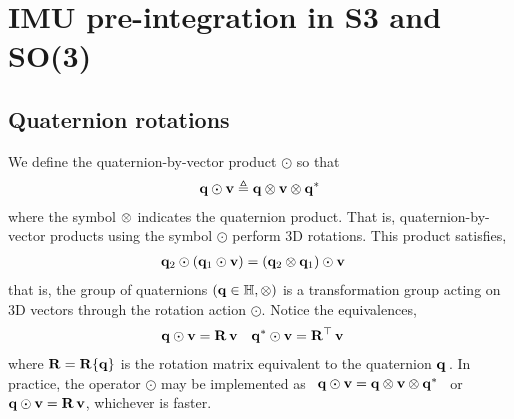

\newcommand{\bw}{{\bfomega}}
\newcommand{\bth}{{\bftheta}}
\newcommand{\bphi}{{\bfphi}}
\newcommand{\nth}{\norm{\bth}}
\newcommand{\ab}{{\bfa_b}}
\newcommand{\wb}{{\bw_b}}
\newcommand{\D}{\Delta}
\newcommand{\Dzero}{{\D^0}}
\newcommand{\Dp}{{\D\bfp}}
\newcommand{\Dv}{{\D\bfv}}
\newcommand{\Dth}{{\D\bth}}
\newcommand{\Dq}{{\D\bfq}}
\newcommand{\DR}{{\D\bfR}}
\newcommand{\DP}{{\D\bfP}}
\newcommand{\DV}{{\D\bfV}}
\newcommand{\DTH}{{\D\bfTheta}}
\newcommand{\Dw}{{\D\bw}}
\newcommand{\DW}{{\D\bfOmega}}
\newcommand{\dpp}{{\delta\bfp}}
\newcommand{\dv}{{\delta\bfv}}
\newcommand{\dth}{{\delta\bth}}
\newcommand{\dq}{{\delta\bfq}}
\newcommand{\dR}{{\delta\bfR}}
\newcommand{\dP}{{\delta\bfP}}
\newcommand{\dV}{{\delta\bfV}}
\newcommand{\dTH}{{\delta\bfTheta}}
\newcommand{\dw}{{\delta\bw}}

\newcommand{\te}{\triangleq}
\newcommand{\od}{\odot}

\newcommand{\tcom}[1]{{\footnotesize/\texttt{#1}/} }
\newcommand{\com}[1]{{\footnotesize/\texttt{#1}/~} }
\newcommand{\cdef}{\com{def}}
\newcommand{\cchain}{\com{chain}}
\newcommand{\ccross}{\com{cross}}
\newcommand{\cJr}{\com{Jr}}
\newcommand{\csmall}{\com{small}}
\newcommand{\cswap}{\com{swap}}
\newcommand{\ctrans}{\com{trans}}
\newcommand{\clog}{\com{Log}}
\newcommand{\clim}{\com{lim}}
\newcommand{\ccancel}{\com{cancel}}
\newcommand{\cexpand}{\com{expand}}
\newcommand{\csubst}{\com{subst}}

\section{IMU pre-integration in S3 and SO(3)}
\subsection{Quaternion rotations}

We define the quaternion-by-vector product $\od$ so that
%
\begin{align}
\bfq\od\bfv \te \bfq\ot\bfv\ot\bfq^*
\end{align}
%
where the symbol $\otimes$ indicates the quaternion product.
That is, quaternion-by-vector products using the symbol $\od$ perform 3D rotations. This product satisfies,
%
\begin{align*}
\bfq_2\od(\bfq_1\od\bfv) &= (\bfq_2\ot\bfq_1)\od\bfv
\end{align*}
%
that is, the group of quaternions $({\bf q}\in{\mathbb H},\otimes)$ is a transformation group acting on 3D vectors through the rotation action $\od$.
Notice the equivalences,
%
\begin{align*}
\bfq\od\bfv &= \bfR\,\bfv
&
\bfq^*\od\bfv &= \bfR\tr\,\bfv
\end{align*}
%
where ${\bf R}={\bf R}\{{\bf q}\}$ is the rotation matrix equivalent to the quaternion ${\bf q}$\,. In practice, the operator $\od$ may be implemented as ~$\bfq\od\bfv = \bfq\ot\bfv\ot\bfq^*$ ~or~ $\bfq\od\bfv = \bfR\,\bfv$, whichever is faster.


